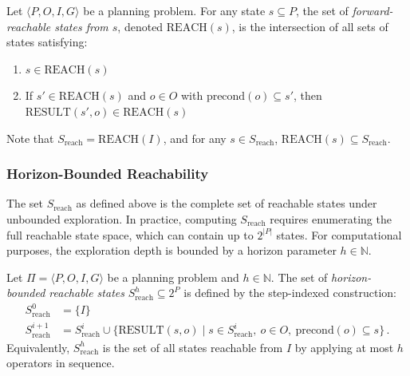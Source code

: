 \begin{defn}
    \label{defn:forward_reachability}
    Let $\langle P, O, I, G \rangle$ be a planning problem. For any state $s \subseteq P$, the set of \emph{forward-reachable states from $s$}, denoted $\text{REACH}(s)$, is the intersection of all sets of states satisfying:
    \begin{enumerate}
        \item $s \in \text{REACH}(s)$
        \item If $s' \in \text{REACH}(s)$ and $o \in O$ with $\text{precond}(o) \subseteq s'$,
              then $\text{RESULT}(s',o) \in \text{REACH}(s)$
    \end{enumerate}
\end{defn}

Note that $S_{\text{reach}} = \text{REACH}(I)$, and for any $s \in S_{\text{reach}}$, $\text{REACH}(s) \subseteq S_{\text{reach}}$.

\subsubsection{Horizon-Bounded Reachability}
\label{sec:horizon_bounded}

The set $S_{\text{reach}}$ as defined above is the complete set of reachable states under unbounded exploration. In practice, computing $S_{\text{reach}}$ requires enumerating the full reachable state space, which can contain up to $2^{|P|}$ states. For computational purposes, the exploration depth is bounded by a horizon parameter $h \in \mathbb{N}$.

\begin{defn}
    \label{defn:bounded_reachable_states}
    Let $\Pi = \langle P, O, I, G \rangle$ be a planning problem and $h \in \mathbb{N}$. The set of \emph{horizon-bounded reachable states} $S^h_{\text{reach}} \subseteq 2^P$ is defined by the step-indexed construction:
    \begin{align*}
        S^0_{\text{reach}}     & = \{I\}                                                                                                                     \\
        S^{i+1}_{\text{reach}} & = S^i_{\text{reach}} \cup \{\text{RESULT}(s,o) \mid s \in S^i_{\text{reach}},\ o \in O,\ \text{precond}(o) \subseteq s\}\,.
    \end{align*}
    Equivalently, $S^h_{\text{reach}}$ is the set of all states reachable from $I$ by applying at most $h$ operators in sequence.
\end{defn}

